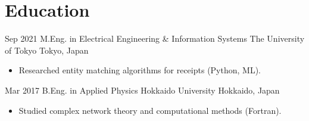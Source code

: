 \documentclass[11pt,letterpaper]{moderncv}
\begin{document}
\section{Education}

\cventry
    {Sep 2021}
    {M.Eng. in Electrical Engineering \& Information Systems}
    {The University of Tokyo}
    {Tokyo, Japan}
    {}
    {
      \begin{itemize}
        \item Researched entity matching algorithms for receipts (Python, ML).
      \end{itemize}
    }

\cventry
    {Mar 2017}
    {B.Eng. in Applied Physics}
    {Hokkaido University}
    {Hokkaido, Japan}
    {}
    {
      \begin{itemize}
        \item Studied complex network theory and computational methods (Fortran).
      \end{itemize}
    }
\end{document}
